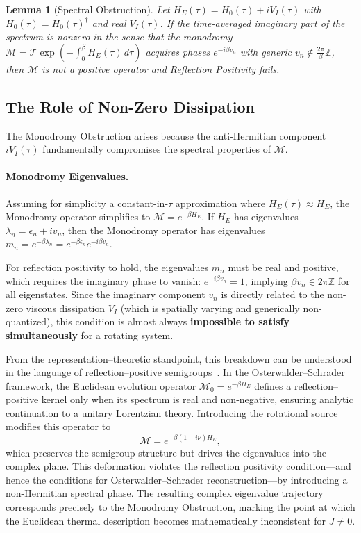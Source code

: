 \documentclass[11pt]{article}
\newtheorem{lemma}{Lemma}
\begin{document}
\begin{lemma}[Spectral Obstruction]\label{lem:spectral-obstruction}
Let $H_E(\tau)=H_0(\tau)+iV_I(\tau)$ with $H_0(\tau)=H_0(\tau)^\dagger$ and real $V_I(\tau)$.
If the time-averaged imaginary part of the spectrum is nonzero in the sense that the monodromy
$\mathcal{M}=\mathcal{T}\exp\!\left(-\int_0^\beta H_E(\tau)\,d\tau\right)$ acquires phases
$e^{-i\beta v_n}$ with generic $v_n\notin\frac{2\pi}{\beta}\mathbb{Z}$, then $\mathcal{M}$ is not a
positive operator and Reflection Positivity fails.
\end{lemma}

\subsection{The Role of Non-Zero Dissipation}

The Monodromy Obstruction arises because the anti-Hermitian component $iV_I(\tau)$ fundamentally compromises the spectral properties of $\mathcal{M}$.

\paragraph{Monodromy Eigenvalues.}
Assuming for simplicity a constant-in-$\tau$ approximation where $H_E(\tau) \approx H_E$, the Monodromy operator simplifies to $\mathcal{M} = e^{-\beta H_E}$. If $H_E$ has eigenvalues $\lambda_n = \epsilon_n + i v_n$, then the Monodromy operator has eigenvalues $m_n = e^{-\beta \lambda_n} = e^{-\beta \epsilon_n} e^{-i \beta v_n}$.

For reflection positivity to hold, the eigenvalues $m_n$ must be real and positive, which requires the imaginary phase to vanish: $e^{-i\beta v_n}=1$, implying $\beta v_n \in 2\pi\mathbb Z$ for all eigenstates. Since the imaginary component $v_n$ is directly related to the non-zero viscous dissipation $V_I$ (which is spatially varying and generically non-quantized), this condition is almost always \textbf{impossible to satisfy simultaneously} for a rotating system.

From the representation--theoretic standpoint, this breakdown can be understood in the language
of reflection--positive semigroups~\cite{NeebOlafsson2018}.
In the Osterwalder--Schrader framework, the Euclidean evolution operator
$\mathcal{M}_0 = e^{-\beta H_E}$ defines a reflection--positive kernel only when its spectrum is
real and non-negative, ensuring analytic continuation to a unitary Lorentzian theory.
Introducing the rotational source modifies this operator to
\[
\mathcal{M} = e^{-\beta (1 - i\nu) H_E},
\]
which preserves the semigroup structure but drives the eigenvalues into the complex plane.
This deformation violates the reflection positivity condition---and hence the conditions for
Osterwalder--Schrader reconstruction---by introducing a non-Hermitian spectral phase.  The
resulting complex eigenvalue trajectory corresponds precisely to the Monodromy Obstruction,
marking the point at which the Euclidean thermal description becomes mathematically
inconsistent for $J \neq 0$.
\end{document}
